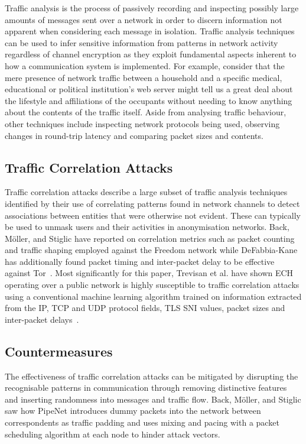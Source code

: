 Traffic analysis is the process of passively recording and inspecting possibly large amounts of messages sent over a network in order to discern information not apparent when considering each message in isolation. Traffic analysis techniques can be used to infer sensitive information from patterns in network activity regardless of channel encryption as they exploit fundamental aspects inherent to how a communication system is implemented. For example, consider that the mere presence of network traffic between a household and a specific medical, educational or political institution's web server might tell us a great deal about the lifestyle and affiliations of the occupants without needing to know anything about the contents of the traffic itself. Aside from analysing traffic behaviour, other techniques include inspecting network protocols being used, observing changes in round-trip latency and comparing packet sizes and contents.

\subsection{Traffic Correlation Attacks}

Traffic correlation attacks describe a large subset of traffic analysis techniques identified by their use of correlating patterns found in network channels to detect associations between entities that were otherwise not evident. These can typically be used to unmask users and their activities in anonymisation networks. Back, Möller, and Stiglic have reported on correlation metrics such as packet counting and traffic shaping employed against the Freedom network while DeFabbia-Kane has additionally found packet timing and inter-packet delay to be effective against Tor~\cite{back2001traffic, defabbia2011analyzing}. Most significantly for this paper, Trevisan et al. have shown ECH operating over a public network is highly susceptible to traffic correlation attacks using a conventional machine learning algorithm trained on information extracted from the IP, TCP and UDP protocol fields, TLS SNI values, packet sizes and inter-packet delays~\cite{trevisan2023attacking}.

\subsection{Countermeasures}

The effectiveness of traffic correlation attacks can be mitigated by disrupting the recognisable patterns in communication through removing distinctive features and inserting randomness into messages and traffic flow. Back, Möller, and Stiglic saw how PipeNet introduces dummy packets into the network between correspondents as traffic padding and uses mixing and pacing with a packet scheduling algorithm at each node to hinder attack vectors.

